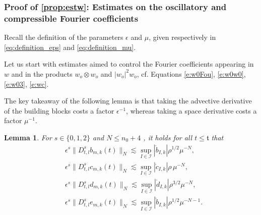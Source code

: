 \documentclass[10pt,a4paper]{amsart}
\numberwithin{equation}{section}
\numberwithin{corollario}{section}
\newtheorem{lemma}{Lemma}
\numberwithin{lemma}{section}
\numberwithin{prop}{section}
\theoremstyle{definition}
\theoremstyle{remark}
\begin{document}
\subsubsection{Proof of \autoref{prop:estw}: Estimates on the oscillatory and compressible Fourier coefficients}
Recall the definition of the parameters $\epsilon$ and $\mu$, given respectively in \eqref{eq:definition_eps} and \eqref{eq:definition_mu}.

Let us start with estimates aimed to control the Fourier coefficients appearing in $w$ and in the products $w_o\otimes w_o$ and $|w_o|^2w_o$, cf. Equations \eqref{e:w0Fou}, \eqref{e:w0w0}, \eqref{e:w03}, \eqref{e:wc}. 

The key takeaway of the following lemma is that taking the advective derivative of the building blocks costs a factor $\epsilon^{-1}$, whereas taking a space derivative costs a factor $\mu^{-1}$.

\begin{lemma}\label{lemma:coeff}
    For $s\in\{0,1,2\}$ and $N\le n_0+4$ , it holds for all $t\le \mathfrak{t}$ that
    \begin{align}
        &\epsilon^{s}\|D_{t,l}^sb_{m,k}(t)\|_N\lesssim \sup_{I \in \mathcal{I}}|\mathring{b}_{I,k}|\rho^{1/2}\mu^{-N},\\
        &\epsilon^{s}\|D_{t,l}^sc_{m,k}(t)\|_N\lesssim \sup_{I\in \mathcal{I}}|\mathring{c}_{I,k}|\rho\,\mu^{-N},\\
        &\epsilon^{s}\|D_{t,l}^sd_{m,k}(t)\|_N\lesssim \sup_{I\in \mathcal{I}}|\mathring{d}_{I,k}|\rho^{3/2}\mu^{-N},\\
        &\epsilon^{s}\|D_{t,l}^se_{m,k}(t)\|_N\lesssim \sup_{I\in \mathcal{I}}|\mathring{b}_{I,k}|\rho^{1/2} \mu^{-N-1}.
    \end{align}
\end{lemma}
\end{document}
